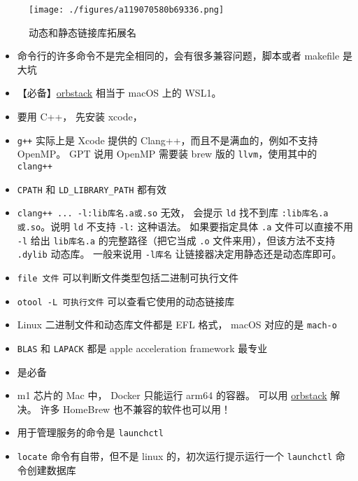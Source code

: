 
\begin{issues}
\issueDraft
\end{issues}

\begin{figure}[ht]
\centering
\texttt{[image: ./figures/a119070580b69336.png]}
\caption{动态和静态链接库拓展名} \label{fig_MacDev_1}
\end{figure}

\begin{itemize}
\item 命令行的许多命令不是完全相同的，会有很多兼容问题，脚本或者 makefile 是大坑
\item 【必备】\href{https://orbstack.dev/}{orbstack} 相当于 macOS 上的 WSL1。
\item 要用 C++， 先安装 xcode， \item \verb`g++` 实际上是 Xcode 提供的 Clang++，而且不是满血的，例如不支持 OpenMP。 GPT 说用 OpenMP 需要装 brew 版的 \verb`llvm`，使用其中的 \verb`clang++`
\item \verb`CPATH` 和 \verb`LD_LIBRARY_PATH` 都有效
\item \verb`clang++ ... -l:lib库名.a或.so` 无效， 会提示 \verb`ld` 找不到库 \verb`:lib库名.a或.so`。说明 \verb`ld` 不支持 \verb`-l:` 这种语法。 如果要指定具体 \verb`.a` 文件可以直接不用 \verb`-l` 给出 \verb`lib库名.a` 的完整路径（把它当成 \verb`.o` 文件来用），但该方法不支持 \verb`.dylib` 动态库。 一般来说用 \verb`-l库名` 让链接器决定用静态还是动态库即可。
\item \verb`file 文件` 可以判断文件类型包括二进制可执行文件
\item \verb`otool -L 可执行文件` 可以查看它使用的动态链接库
\item Linux 二进制文件和动态库文件都是 EFL 格式， macOS 对应的是 \verb`mach-o`
\item \verb`BLAS` 和 \verb`LAPACK` 都是 apple acceleration framework 最专业
\item {} 是必备
\item m1 芯片的 Mac 中， Docker 只能运行 arm64 的容器。 可以用 \href{https://orbstack.dev/}{orbstack} 解决。 许多 HomeBrew 也不兼容的软件也可以用！
\item 用于管理服务的命令是 \verb`launchctl`
\item \verb`locate` 命令有自带，但不是 linux 的，初次运行提示运行一个 \verb`launchctl` 命令创建数据库
\end{itemize}
